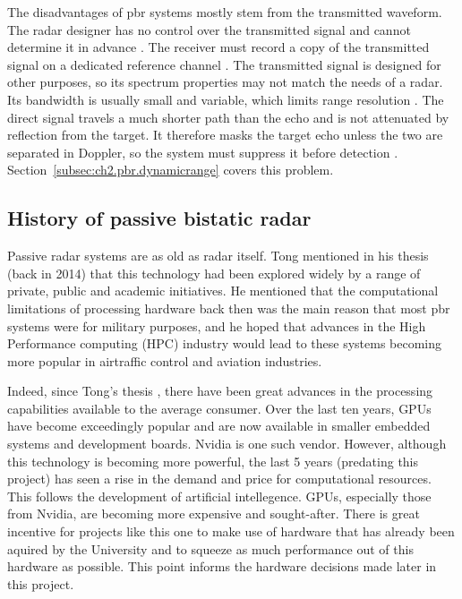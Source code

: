 The disadvantages of \gls{pbr} systems mostly stem from the transmitted waveform. The radar designer has no control over the transmitted signal and cannot determine it in advance \citep{kuschel2019}. The receiver must record a copy of the transmitted signal on a dedicated reference channel \citep{kuschel2019}. The transmitted signal is designed for other purposes, so its spectrum properties may not match the needs of a radar. Its bandwidth is usually small and variable, which limits range resolution \citep{kuschel2019}. The direct signal travels a much shorter path than the echo and is not attenuated by reflection from the target. It therefore masks the target echo unless the two are separated in Doppler, so the system must suppress it before detection \citep{kuschel2019}. Section~\ref{subsec:ch2.pbr.dynamicrange} covers this problem.

\subsection{History of passive bistatic radar}
\label{subsec:ch2.pbr.fm}
Passive radar systems are as old as radar itself. Tong \cite{tong2014} mentioned in his thesis (back in 2014) that this technology had been explored widely by a range of private, public and academic initiatives. He mentioned that the computational limitations of processing hardware back then was the main reason that most \gls{pbr} systems were for military purposes, and he hoped that advances in the High Performance computing (HPC) industry would lead to these systems becoming more popular in airtraffic control and aviation industries.


Indeed, since Tong's thesis \cite{tong2014}, there have been great advances in the processing capabilities available to the average consumer. Over the last ten years, GPUs have become exceedingly popular and are now available in smaller embedded systems and development boards. Nvidia is one such vendor. However, although this technology is becoming more powerful, the last 5 years (predating this project) has seen a rise in the demand and price for computational resources. This follows the development of artificial intellegence. GPUs, especially those from Nvidia, are becoming more expensive and sought-after. There is great incentive for projects like this one to make use of hardware that has already been aquired by the University and to squeeze as much performance out of this hardware as possible. This point informs the hardware decisions made later in this project.

